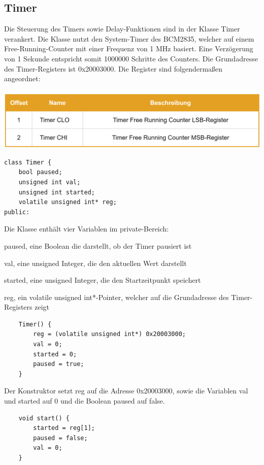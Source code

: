 \documentclass[12pt]{article}
\begin{document}
\subsection{Timer}
Die Steuerung des Timers sowie Delay-Funktionen sind in der Klasse Timer verankert. Die Klasse nutzt den System-Timer des BCM2835, welcher auf einem Free-Running-Counter mit einer Frequenz von 1 MHz basiert. Eine Verzögerung von 1 Sekunde entspricht somit 1000000 Schritte des Counters. Die Grundadresse des Timer-Registers ist 0x20003000. Die Register sind folgendermaßen angeordnet:\\\\
\includegraphics[width=\textwidth]{img/timer_table.png}
\begin{center}\end{center}
\begin{verbatim}
class Timer {
    bool paused;
    unsigned int val;
    unsigned int started;
    volatile unsigned int* reg;
public: 
\end{verbatim}
Die Klasse enthält vier Variablen im private-Bereich: 
\begin{compactitem}
\item paused, eine Boolean die darstellt, ob der Timer pausiert ist
\item val, eine unsigned Integer, die den aktuellen Wert darstellt
\item started, eine unsigned Integer, die den Startzeitpunkt speichert
\item reg, ein volatile unsigned int*-Pointer, welcher auf die Grundadresse des Timer-Registers zeigt
\end{compactitem}
\begin{verbatim}
    Timer() {
        reg = (volatile unsigned int*) 0x20003000;
        val = 0;
        started = 0;
        paused = true;
    }

\end{verbatim} 
Der Konstruktor setzt reg auf die Adresse 0x20003000, sowie die Variablen val und started auf 0 und die Boolean paused auf false.\\
\begin{verbatim}
    void start() {
        started = reg[1];
        paused = false;
        val = 0;
    }
\end{verbatim}
\end{document}
